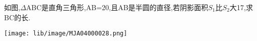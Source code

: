 如图,$\Delta$ABC是直角三角形,AB=20,且AB是半圆的直径,若阴影面积$S_1$比$S_2$大17,求BC的长.

\begin{flushright}

    \texttt{[image: lib/image/MJA04000028.png]}

\end{flushright}



